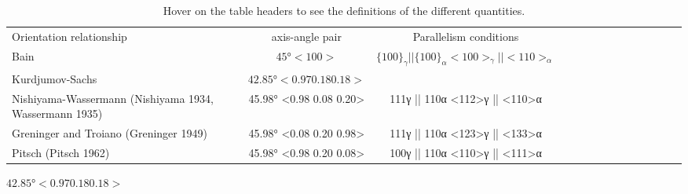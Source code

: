 
\begin{table*}
\caption{Hover on the table headers to see the definitions of the  different quantities.}
\label{table}
\begin{tabular}{l c | c c c c c c  c c c c c c}
\hline\hline
    Orientation relationship & axis-angle pair & Parallelism conditions \\
    Bain \cite{bain1924nature} & \(45°<100>\) & $\{100\}_{\gamma} || \{100\}_{\alpha} <100>_{\gamma } || <110>_{\alpha}$ \\
    Kurdjumov-Sachs \cite{kurdjumow1930mechanismus} & \(42.85°<0.970.180.18>\) &  \\
    Nishiyama-Wassermann (Nishiyama 1934, Wassermann 1935) & 45.98° <0.98 0.08 0.20> & {111}γ || {110}α <112>γ || <110>α \\
    Greninger and Troiano (Greninger 1949) & 45.98° <0.08 0.20 0.98> & {111}γ || {110}α <123>γ || <133>α \\
    Pitsch (Pitsch 1962) & 45.98° <0.98 0.20 0.08> & {100}γ || {110}α <110>γ || <111>α \\
\hline
\end{tabular}
\end{table*}
\(42.85°<0.970.180.18>\)